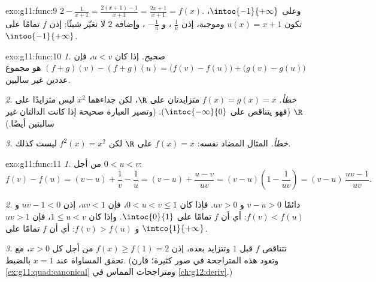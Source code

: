 \begin{solution}{exo:g11:func:9}
$2 - \frac{1}{x+1} = \frac{2(x+1) - 1}{x+1} = \frac{2x+1}{x+1} = f(x)$.
وعلى $\intoo{-1}{+\infty}$، تكون $u(x) = x + 1$  وموجبة، إذن
$\frac1u$ ، و $-\frac1u$ ، وإضافة $2$ لا تغيّر
شيئًا: إذن $f$  تمامًا على $\intoo{-1}{+\infty}$.
\end{solution}

\begin{solution}{exo:g11:func:10}
\emph{1. صحيح.} إذا كان $u < v$، فإن
$(f+g)(v) - (f+g)(u) = \bigl(f(v)-f(u)\bigr) + \bigl(g(v)-g(u)\bigr)$ هو
مجموع عددين غير سالبين.

\emph{2. خطأ.} $f(x) = g(x) = x$ متزايدتان على $\R$، لكن
جداءهما $x^2$ ليس متزايدًا على $\R$ (فهو يتناقص على
$\intoc{-\infty}{0}$). (وتصير العبارة صحيحة إذا كانت الدالتان
غير سالبتين أيضًا.)

\emph{3. خطأ.} المثال المضاد نفسه:  $f(x) = x$  على $\R$
لكن $f^2(x) = x^2$ ليست كذلك.
\end{solution}

\begin{solution}{exo:g11:func:11}
\emph{1.} من أجل $0 < u < v$:
\[
f(v) - f(u) = (v - u) + \frac1v - \frac1u
= (v - u) + \frac{u - v}{uv}
= (v - u)\left(1 - \frac{1}{uv}\right)
= (v - u)\,\frac{uv - 1}{uv}.
\]

\emph{2.} دائمًا $v - u > 0$ و $uv > 0$. فإذا كان $0 < u < v \leq 1$، فإن
$uv < 1$، إذن $uv - 1 < 0$ و $f(v) < f(u)$: أي أن $f$  تمامًا
على $\intoc{0}{1}$. وإذا كان $1 \leq u < v$، فإن $uv > 1$ و $f(v) > f(u)$:
أي أن $f$  تمامًا على $\intco{1}{+\infty}$.

\emph{3.} تتناقص $f$ قبل $1$ وتتزايد بعده، إذن
$f(x) \geq f(1) = 2$ من أجل كل $x > 0$، مع تحقق المساواة عند $x = 1$ بالضبط.
(وتعود هذه المتراجحة في صور كثيرة؛ قارن
\cref{ex:g11:quad:canonical} ومتراجحات المماس في
\cref{ch:g12:deriv}.)
\end{solution}

